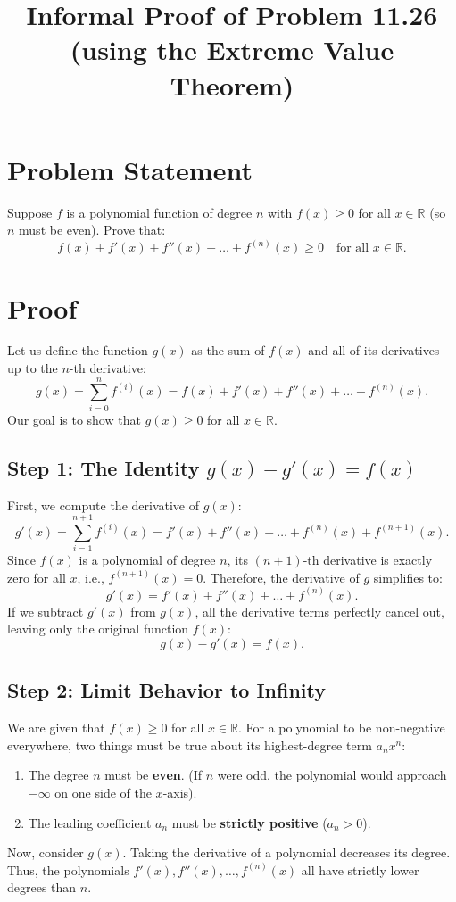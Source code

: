 \documentclass[12pt, a4paper]{article}
\title{Informal Proof of Problem 11.26 (using the Extreme Value Theorem)}
\author{}
\date{}
\begin{document}
\maketitle

\section*{Problem Statement}
Suppose $f$ is a polynomial function of degree $n$ with $f(x) \ge 0$ for all $x \in \mathbb{R}$ (so $n$ must be even). Prove that:
\[
f(x) + f'(x) + f''(x) + \dots + f^{(n)}(x) \ge 0 \quad \text{for all } x \in \mathbb{R}.
\]

\section*{Proof}

Let us define the function $g(x)$ as the sum of $f(x)$ and all of its derivatives up to the $n$-th derivative:
\[
g(x) = \sum_{i=0}^n f^{(i)}(x) = f(x) + f'(x) + f''(x) + \dots + f^{(n)}(x).
\]
Our goal is to show that $g(x) \ge 0$ for all $x \in \mathbb{R}$.

\subsection*{Step 1: The Identity $g(x) - g'(x) = f(x)$}
First, we compute the derivative of $g(x)$:
\[
g'(x) = \sum_{i=1}^{n+1} f^{(i)}(x) = f'(x) + f''(x) + \dots + f^{(n)}(x) + f^{(n+1)}(x).
\]
Since $f(x)$ is a polynomial of degree $n$, its $(n+1)$-th derivative is exactly zero for all $x$, i.e., $f^{(n+1)}(x) = 0$. Therefore, the derivative of $g$ simplifies to:
\[
g'(x) = f'(x) + f''(x) + \dots + f^{(n)}(x).
\]
If we subtract $g'(x)$ from $g(x)$, all the derivative terms perfectly cancel out, leaving only the original function $f(x)$:
\[
g(x) - g'(x) = f(x).
\]

\subsection*{Step 2: Limit Behavior to Infinity}
We are given that $f(x) \ge 0$ for all $x \in \mathbb{R}$. For a polynomial to be non-negative everywhere, two things must be true about its highest-degree term $a_n x^n$:
\begin{enumerate}
    \item The degree $n$ must be \textbf{even}. (If $n$ were odd, the polynomial would approach $-\infty$ on one side of the $x$-axis).
    \item The leading coefficient $a_n$ must be \textbf{strictly positive} ($a_n > 0$).
\end{enumerate}
Now, consider $g(x)$. Taking the derivative of a polynomial decreases its degree. Thus, the polynomials $f'(x), f''(x), \dots, f^{(n)}(x)$ all have strictly lower degrees than $n$.
\end{document}
